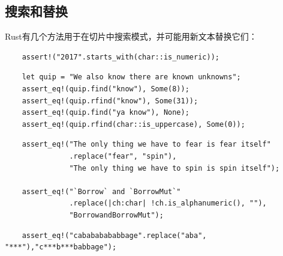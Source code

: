 \subsection{搜索和替换}

Rust有几个方法用于在切片中搜索模式，并可能用新文本替换它们：


\begin{verbatim}
    assert!("2017".starts_with(char::is_numeric));
\end{verbatim}

\begin{verbatim}
    let quip = "We also know there are known unknowns";
    assert_eq!(quip.find("know"), Some(8));
    assert_eq!(quip.rfind("know"), Some(31));
    assert_eq!(quip.find("ya know"), None);
    assert_eq!(quip.rfind(char::is_uppercase), Some(0));
\end{verbatim}

\begin{verbatim}
    assert_eq!("The only thing we have to fear is fear itself"
               .replace("fear", "spin"),
               "The only thing we have to spin is spin itself");

    assert_eq!("`Borrow` and `BorrowMut`"
               .replace(|ch:char| !ch.is_alphanumeric(), ""),
               "BorrowandBorrowMut");
\end{verbatim}

\begin{verbatim}
    assert_eq!("cabababababbage".replace("aba", "***"),"c***b***babbage");
\end{verbatim}


